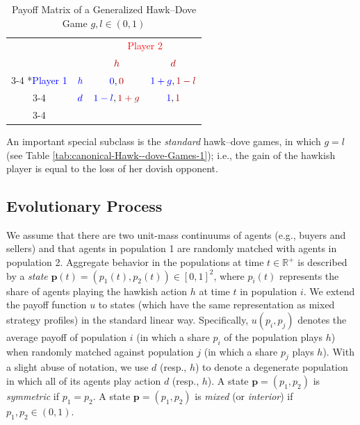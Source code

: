 \documentclass[12pt]{article}
\numberwithin{equation}{section}
\numberwithin{figure}{section}
\theoremstyle{definition}
\theoremstyle{plain}
\theoremstyle{plain}
\theoremstyle{plain}
\theoremstyle{remark}
\theoremstyle{plain}
\theoremstyle{plain}
\begin{document}
\begin{table}
\begin{centering}
\caption{Payoff Matrix of a Generalized Hawk--Dove Game $g,l\in\left(0,1\right)$ \label{tab:Generalized-Hawk--dove-Games}}
\par\end{centering}
\smallskip{}
\centering
    \setlength{\extrarowheight}{2pt}
    \begin{tabular}{cc|c|c|}
      & \multicolumn{1}{c}{} & \multicolumn{2}{c}{\textcolor{red}{Player 2} \vspace{-0.5em}}\\
      & \multicolumn{1}{c}{} & \multicolumn{1}{c}{$\textcolor{red}{h}$}  & \multicolumn{1}{c}{$\textcolor{red}{d}$} \\\cline{3-4}
      \multirow{2}*{\textcolor{blue}{Player 1}}  & $\textcolor{blue}{h}$ & $\textcolor{blue}{0},\textcolor{red}{0}$ & $\textcolor{blue}{1+g},\textcolor{red}{1-l}$ \\\cline{3-4}
      & $\textcolor{blue}{d}$ & $\textcolor{blue}{1-l},\textcolor{red}{1+g}$ & $\textcolor{blue}{1},\textcolor{red}{1}$ \\\cline{3-4}
    \end{tabular}
  \end{table}
An important special 
subclass  is
the \emph{standard} hawk--dove games, 
in which $g=l$ (see Table \ref{tab:canonical-Hawk--dove-Games-1}); i.e., the gain of the hawkish player is equal to the loss of her dovish opponent.
\subsection{Evolutionary Process}

We assume that there are two unit-mass continuums of agents 
(e.g., buyers and sellers) and that
agents in population 1 are randomly matched with agents in population
2. Aggregate behavior in the populations
at time $t\in\mathbb{R}^{+}$ is described by a \emph{state}
$\mathbf{p}\left(t\right)=\left(p_{1}\left(t\right),p_{2}\left(t\right)\right)\in\left[0,1\right]^{2}$,
where $p_{i}\left(t\right)$ represents the share of agents playing
the hawkish action $h$ at time $t$ in population $i$. We extend
the payoff function $u$ to states (which have the same
representation as mixed strategy profiles) in the standard linear
way. Specifically, $u(p_i,p_j)$ denotes the average payoff of population $i$ (in which a share $p_i$ of the population plays $h$)   
when randomly matched against population $j$ (in which a share $p_j$  plays $h$).
With a slight abuse of notation, we use $d$ (resp., $h$)
to denote a degenerate population in which all of its agents play action $d$ (resp., $h$).
A state $\mathbf{p}=\left(p_{1},p_{2}\right)$ is \emph{symmetric} if $p_{1}=p_{2}$. 
A state $\mathbf{p}=\left(p_{1},p_{2}\right)$ is 
\emph{mixed} (or \emph{interior}) if $p_1,p_2\in(0,1).$ 
\end{document}

